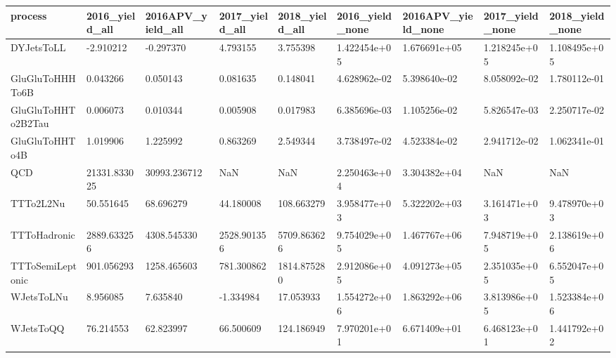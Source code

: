 \begin{tabular}{lllllllll}
\toprule
           process & 2016\_yield\_all & 2016APV\_yield\_all & 2017\_yield\_all & 2018\_yield\_all & 2016\_yield\_none & 2016APV\_yield\_none & 2017\_yield\_none & 2018\_yield\_none \\
\midrule
        DYJetsToLL &      -2.910212 &         -0.297370 &       4.793155 &       3.755398 &    1.422454e+05 &       1.676691e+05 &    1.218245e+05 &    1.108495e+05 \\
   GluGluToHHHTo6B &       0.043266 &          0.050143 &       0.081635 &       0.148041 &    4.628962e-02 &       5.398640e-02 &    8.058092e-02 &    1.780112e-01 \\
GluGluToHHTo2B2Tau &       0.006073 &          0.010344 &       0.005908 &       0.017983 &    6.385696e-03 &       1.105256e-02 &    5.826547e-03 &    2.250717e-02 \\
    GluGluToHHTo4B &       1.019906 &          1.225992 &       0.863269 &       2.549344 &    3.738497e-02 &       4.523384e-02 &    2.941712e-02 &    1.062341e-01 \\
               QCD &   21331.833025 &      30993.236712 &            NaN &            NaN &    2.250463e+04 &       3.304382e+04 &             NaN &             NaN \\
         TTTo2L2Nu &      50.551645 &         68.696279 &      44.180008 &     108.663279 &    3.958477e+03 &       5.322202e+03 &    3.161471e+03 &    9.478970e+03 \\
      TTToHadronic &    2889.633256 &       4308.545330 &    2528.901356 &    5709.863626 &    9.754029e+05 &       1.467767e+06 &    7.948719e+05 &    2.138619e+06 \\
  TTToSemiLeptonic &     901.056293 &       1258.465603 &     781.300862 &    1814.875280 &    2.912086e+05 &       4.091273e+05 &    2.351035e+05 &    6.552047e+05 \\
        WJetsToLNu &       8.956085 &          7.635840 &      -1.334984 &      17.053933 &    1.554272e+06 &       1.863292e+06 &    3.813986e+05 &    1.523384e+06 \\
         WJetsToQQ &      76.214553 &         62.823997 &      66.500609 &     124.186949 &    7.970201e+01 &       6.671409e+01 &    6.468123e+01 &    1.441792e+02 \\
\bottomrule
\end{tabular}
